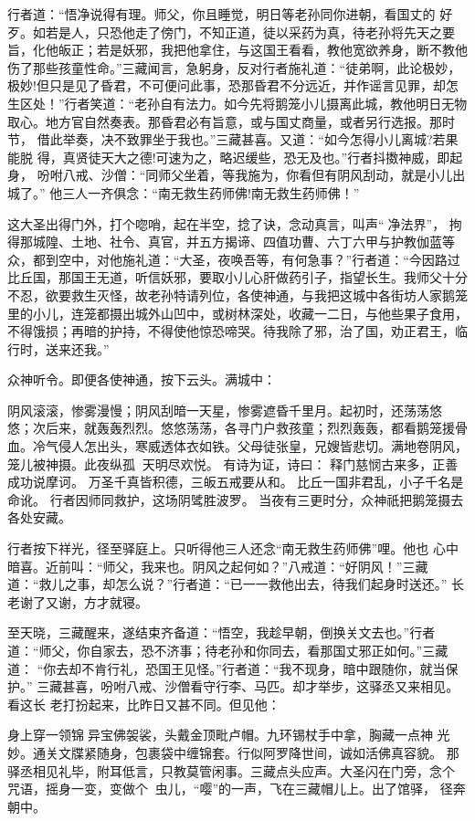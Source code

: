 行者道：“悟净说得有理。师父，你且睡觉，明日等老孙同你进朝，看国丈的
好歹。如若是人，只恐他走了傍门，不知正道，徒以采药为真，待老孙将先天之要
旨，化他皈正；若是妖邪，我把他拿住，与这国王看看，教他宽欲养身，断不教他
伤了那些孩童性命。”三藏闻言，急躬身，反对行者施礼道：“徒弟啊，此论极妙，
极妙!但只是见了昏君，不可便问此事，恐那昏君不分远近，并作谣言见罪，却怎
生区处！”行者笑道：“老孙自有法力。如今先将鹅笼小儿摄离此城，教他明日无物
取心。地方官自然奏表。那昏君必有旨意，或与国丈商量，或者另行选报。那时节，
借此举奏，决不致罪坐于我也。”三藏甚喜。又道：“如今怎得小儿离城?若果能脱
得，真贤徒天大之德!可速为之，略迟缓些，恐无及也。”行者抖擞神威，即起身，
吩咐八戒、沙僧：“同师父坐着，等我施为，你看但有阴风刮动，就是小儿出城了。”
他三人一齐俱念：“南无救生药师佛!南无救生药师佛！”

这大圣出得门外，打个唿哨，起在半空，捻了诀，念动真言，叫声“净法界”，
拘得那城隍、土地、社令、真官，并五方揭谛、四值功曹、六丁六甲与护教伽蓝等
众，都到空中，对他施礼道：“大圣，夜唤吾等，有何急事？”行者道：“今因路过
比丘国，那国王无道，听信妖邪，要取小儿心肝做药引子，指望长生。我师父十分
不忍，欲要救生灭怪，故老孙特请列位，各使神通，与我把这城中各街坊人家鹅笼
里的小儿，连笼都摄出城外山凹中，或树林深处，收藏一二日，与他些果子食用，
不得饿损；再暗的护持，不得使他惊恐啼哭。待我除了邪，治了国，劝正君王，临
行时，送来还我。”

众神听令。即便各使神通，按下云头。满城中：

阴风滚滚，惨雾漫慢；阴风刮暗一天星，惨雾遮昏千里月。起初时，还荡荡悠
悠；次后来，就轰轰烈烈。悠悠荡荡，各寻门户救孩童；烈烈轰轰，都看鹅笼援骨
血。冷气侵人怎出头，寒威透体衣如铁。父母徒张皇，兄嫂皆悲切。满地卷阴风，
笼儿被神摄。此夜纵孤，天明尽欢悦。
有诗为证，诗曰：
释门慈悯古来多，正善成功说摩诃。
万圣千真皆积德，三皈五戒要从和。
比丘一国非君乱，小子千名是命讹。
行者因师同救护，这场阴骘胜波罗。
当夜有三更时分，众神祇把鹅笼摄去各处安藏。

行者按下祥光，径至驿庭上。只听得他三人还念“南无救生药师佛”哩。他也
心中暗喜。近前叫：“师父，我来也。阴风之起何如？”八戒道：“好阴风！”三藏
道：“救儿之事，却怎么说？”行者道：“已一一救他出去，待我们起身时送还。”
长老谢了又谢，方才就寝。

至天晓，三藏醒来，遂结束齐备道：“悟空，我趁早朝，倒换关文去也。”行者
道：“师父，你自家去，恐不济事；待老孙和你同去，看那国丈邪正如何。”三藏道：
“你去却不肯行礼，恐国王见怪。”行者道：“我不现身，暗中跟随你，就当保护。”
三藏甚喜，吩咐八戒、沙僧看守行李、马匹。却才举步，这驿丞又来相见。看这长
老打扮起来，比昨日又甚不同。但见他：

身上穿一领锦异宝佛袈裟，头戴金顶毗卢帽。九环锡杖手中拿，胸藏一点神
光妙。通关文牒紧随身，包裹袋中缠锦套。行似阿罗降世间，诚如活佛真容貌。
那驿丞相见礼毕，附耳低言，只教莫管闲事。三藏点头应声。大圣闪在门旁，念个
咒语，摇身一变，变做个虫儿，“嘤”的一声，飞在三藏帽儿上。出了馆驿，
径奔朝中。

